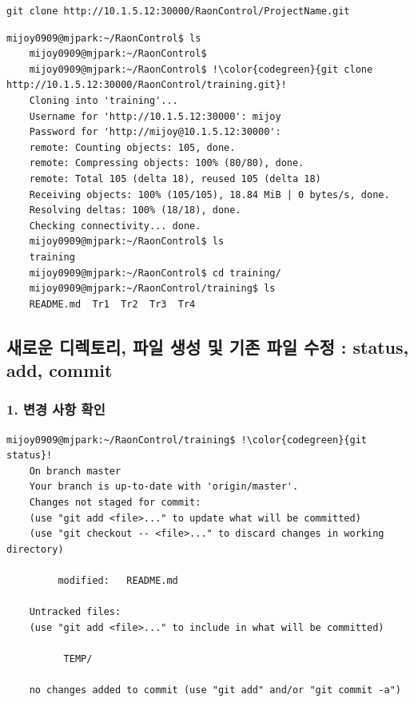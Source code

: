 \documentclass[11pt
  , a4paper
  , article
  , oneside
]{memoir}
\begin{document}
	\begin{lstlisting}[style=termstyle, escapechar=!]	
	git clone http://10.1.5.12:30000/RaonControl/ProjectName.git \end{lstlisting}
	
	\begin{lstlisting}[style=termstyle, escapechar=!]	
	mijoy0909@mjpark:~/RaonControl$ ls
	mijoy0909@mjpark:~/RaonControl$ 
	mijoy0909@mjpark:~/RaonControl$ !\color{codegreen}{git clone http://10.1.5.12:30000/RaonControl/training.git}!
	Cloning into 'training'...
	Username for 'http://10.1.5.12:30000': mijoy  
	Password for 'http://mijoy@10.1.5.12:30000': 
	remote: Counting objects: 105, done.
	remote: Compressing objects: 100% (80/80), done.
	remote: Total 105 (delta 18), reused 105 (delta 18)
	Receiving objects: 100% (105/105), 18.84 MiB | 0 bytes/s, done.
	Resolving deltas: 100% (18/18), done.
	Checking connectivity... done. 
	mijoy0909@mjpark:~/RaonControl$ ls
	training
	mijoy0909@mjpark:~/RaonControl$ cd training/
	mijoy0909@mjpark:~/RaonControl/training$ ls
	README.md  Tr1  Tr2  Tr3  Tr4 \end{lstlisting}
	
\subsection{새로운 디렉토리, 파일 생성 및 기존 파일 수정 : status, add, commit}

	\subsubsection {1. 변경 사항 확인}
	\begin{lstlisting}[style=termstyle, escapechar=!]	
	mijoy0909@mjpark:~/RaonControl/training$ !\color{codegreen}{git status}!                      
	On branch master
	Your branch is up-to-date with 'origin/master'.
	Changes not staged for commit:
	(use "git add <file>..." to update what will be committed)
	(use "git checkout -- <file>..." to discard changes in working directory)
	
         modified:   README.md
	
	Untracked files:
	(use "git add <file>..." to include in what will be committed)
	
	      TEMP/
	
	no changes added to commit (use "git add" and/or "git commit -a") \end{lstlisting}
\end{document}
